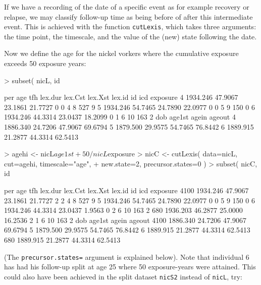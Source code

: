 \documentclass[a4paper,twoside,12pt]{article}
\begin{document}
If we have a recording of the date of a specific event as for example
recovery or relapse, we may classify follow-up time as being before of
after this intermediate event. This is achieved with the function
\texttt{cutLexis}, which takes three arguments: the time point, the
timescale, and the value of the (new) state following the date.

Now we define the age for the nickel vorkers where the cumulative
exposure exceeds 50 exposure years:
\begin{Schunk}
\begin{Sinput}
> subset( nicL, id %in% 8:10 )
\end{Sinput}
\begin{Soutput}
       per     age     tfh lex.dur lex.Cst lex.Xst lex.id id icd exposure
4 1934.246 47.9067 23.1861 21.7727       0       0      4  8 527        9
5 1934.246 54.7465 24.7890 22.0977       0       0      5  9 150        0
6 1934.246 44.3314 23.0437 18.2099       0       1      6 10 163        2
       dob  age1st   agein  ageout
4 1886.340 24.7206 47.9067 69.6794
5 1879.500 29.9575 54.7465 76.8442
6 1889.915 21.2877 44.3314 62.5413
\end{Soutput}
\begin{Sinput}
> agehi <- nicL$age1st + 50 / nicL$exposure
> nicC <- cutLexis( data=nicL, cut=agehi, timescale="age",
+                   new.state=2, precursor.states=0 )
> subset( nicC, id %in% 8:10 )
\end{Sinput}
\begin{Soutput}
          per     age     tfh lex.dur lex.Cst lex.Xst lex.id id icd exposure
4100 1934.246 47.9067 23.1861 21.7727       2       2      4  8 527        9
5    1934.246 54.7465 24.7890 22.0977       0       0      5  9 150        0
6    1934.246 44.3314 23.0437  1.9563       0       2      6 10 163        2
680  1936.203 46.2877 25.0000 16.2536       2       1      6 10 163        2
          dob  age1st   agein  ageout
4100 1886.340 24.7206 47.9067 69.6794
5    1879.500 29.9575 54.7465 76.8442
6    1889.915 21.2877 44.3314 62.5413
680  1889.915 21.2877 44.3314 62.5413
\end{Soutput}
\end{Schunk}
(The \texttt{precursor.states=} argument is explained below).
Note that individual 6 has had his follow-up split at age 25 where 50
exposure-years were attained. This could also have been achieved in
the split dataset \texttt{nicS2} instead of \texttt{nicL}, try:
\end{document}
